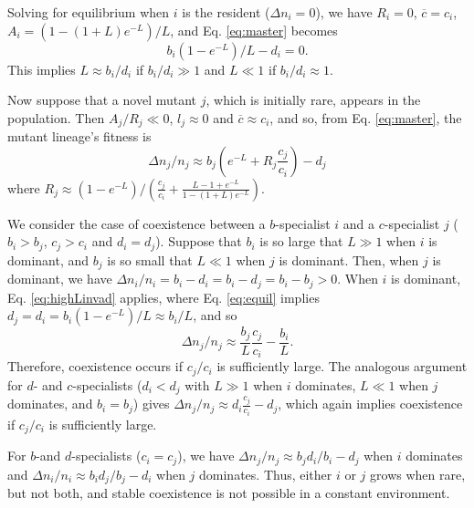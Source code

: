 \documentclass[11pt]{article}
\begin{document}
Solving for equilibrium when $i$ is the resident ($\Delta n_i = 0$), we have $R_i=0$, $\overline{c}=c_i$, $A_i=(1-(1+L)e^{-L})/L$, and Eq. \eqref{eq:master} becomes
\begin{equation}
b_i(1-e^{-L})/L-d_i=0.\label{eq:equil}
\end{equation}
This implies $L\approx b_i/d_i$ if $b_i/d_i\gg 1$ and $L\ll 1$ if $b_i/d_i\approx 1$. 

Now suppose that a novel mutant $j$, which is initially rare, appears in the population. Then $A_j/R_j\ll 0$, $l_j\approx 0$ and $\overline{c}\approx c_i$, and so, from Eq. \eqref{eq:master}, the mutant lineage's fitness is
\begin{equation}
\Delta n_j/n_j \approx b_j \left(e^{-L}+R_j\frac{c_j}{c_i}\right)-d_j \label{eq:invad}
\end{equation}
where $R_j\approx (1-e^{-L})/\left(\frac{c_j}{c_i}+\frac{L-1+e^{-L}}{1-(1+L)e^{-L}}\right)$.

We consider the case of coexistence between a $b$-specialist $i$ and a $c$-specialist $j$ ($b_i>b_j$, $c_j>c_i$ and $d_i=d_j$). Suppose that $b_i$ is so large that $L\gg 1$ when $i$ is dominant, and $b_j$ is so small that $L\ll 1$ when $j$ is dominant. Then, when $j$ is dominant, we have $\Delta n_i/n_i=b_i-d_i=b_i-d_j=b_i-b_j>0$. When $i$ is dominant, Eq.  \eqref{eq:highLinvad} applies, where Eq. \eqref{eq:equil} implies $d_j=d_i=b_i(1-e^{-L})/L\approx b_i/L$, and so
\begin{equation}
\Delta n_j/n_j \approx \frac{b_j}{L}\frac{c_j}{c_i}-\frac{b_i}{L}.
\end{equation}
Therefore, coexistence occurs if $c_j/c_i$ is sufficiently large. The analogous argument for $d$- and $c$-specialists ($d_i<d_j$ with $L\gg 1$ when $i$ dominates, $L\ll 1$ when $j$ dominates, and $b_i=b_j$) gives $\Delta n_j/n_j \approx d_i\frac{c_j}{c_i}-d_j$, which again implies coexistence if $c_j/c_i$ is sufficiently large.

For $b$-and $d$-specialists ($c_i=c_j$), we have $\Delta n_j/n_j\approx b_j d_i/b_i-d_j$ when $i$ dominates and $\Delta n_i/n_i\approx b_i d_j/b_j-d_i$ when $j$ dominates. Thus, either $i$ or $j$ grows when rare, but not both, and stable coexistence is not possible in a constant environment.
\end{document}
